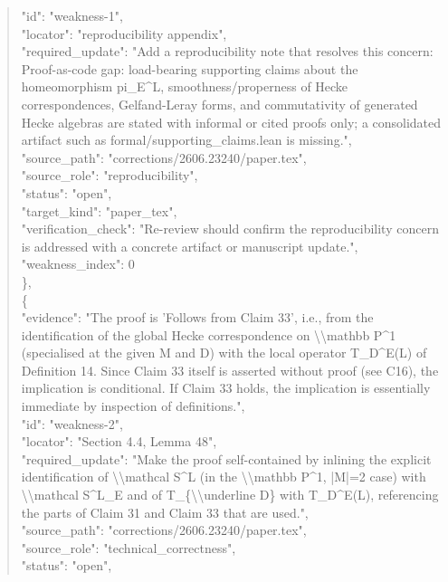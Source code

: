 \documentclass[11pt]{article}
\begin{document}
\begin{quote}
      "id": "weakness-1",\\
      "locator": "reproducibility appendix",\\
      "required\_update": "Add a reproducibility note that resolves this concern: Proof-as-code gap: load-bearing supporting claims about the homeomorphism pi\_E\^{}L, smoothness/properness of Hecke correspondences, Gelfand-Leray forms, and commutativity of generated Hecke algebras are stated with informal or cited proofs only; a consolidated artifact such as formal/supporting\_claims.lean is missing.",\\
      "source\_path": "corrections/2606.23240/paper.tex",\\
      "source\_role": "reproducibility",\\
      "status": "open",\\
      "target\_kind": "paper\_tex",\\
      "verification\_check": "Re-review should confirm the reproducibility concern is addressed with a concrete artifact or manuscript update.",\\
      "weakness\_index": 0\\
    \},\\
    \{\\
      "evidence": "The proof is 'Follows from Claim 33', i.e., from the identification of the global Hecke correspondence on \textbackslash{}\textbackslash{}mathbb P\^{}1 (specialised at the given M and D) with the local operator T\_D\^{}E(L) of Definition 14. Since Claim 33 itself is asserted without proof (see C16), the implication is conditional. If Claim 33 holds, the implication is essentially immediate by inspection of definitions.",\\
      "id": "weakness-2",\\
      "locator": "Section 4.4, Lemma 48",\\
      "required\_update": "Make the proof self-contained by inlining the explicit identification of \textbackslash{}\textbackslash{}mathcal S\^{}L (in the \textbackslash{}\textbackslash{}mathbb P\^{}1, |M|=2 case) with \textbackslash{}\textbackslash{}mathcal S\^{}L\_E and of T\_\{\textbackslash{}\textbackslash{}underline D\} with T\_D\^{}E(L), referencing the parts of Claim 31 and Claim 33 that are used.",\\
      "source\_path": "corrections/2606.23240/paper.tex",\\
      "source\_role": "technical\_correctness",\\
      "status": "open",\\

\end{quote}
\end{document}
